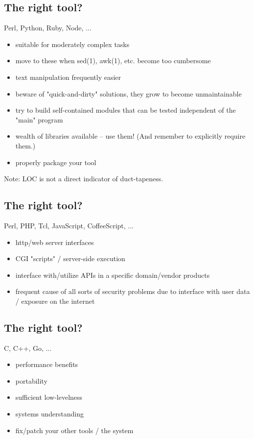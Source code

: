 \documentclass[xga]{xdvislides}
\begin{document}
\subsection{The right tool?}
Perl, Python, Ruby, Node, ... \\

\begin{itemize}
	\item suitable for moderately complex tasks
	\item move to these when sed(1), awk(1), etc. become too cumbersome
	\item text manipulation frequently easier
	\item beware of "quick-and-dirty" solutions, they grow to become
		unmaintainable
	\item try to build self-contained modules that can be tested independent of
		the "main" program
	\item wealth of libraries available -- use them! (And remember to explicitly
		require them.)
	\item properly package your tool
\end{itemize}

Note: LOC is not a direct indicator of duct-tapeness.

\subsection{The right tool?}
Perl, PHP, Tcl, JavaScript, CoffeeScript, ... \\

\begin{itemize}
	\item http/web server interfaces
	\item CGI "scripts" / server-side execution
	\item interface with/utilize APIs in a specific domain/vendor products
	\item frequent cause of all sorts of security problems due to interface with
		user data / exposure on the internet
\end{itemize}

\subsection{The right tool?}
C, C++, Go, ... \\

\begin{itemize}
	\item performance benefits
	\item portability
	\item sufficient low-levelness
	\item systems understanding
	\item fix/patch your other tools / the system
\end{itemize}
\end{document}
